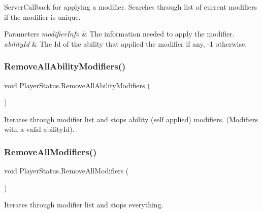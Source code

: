 Server\+Callback for applying a modifier. Searches through list of current modifiers if the modifier is unique. 


\begin{DoxyParams}{Parameters}
{\em modifier\+Info} & The information needed to apply the modifier.\\
\hline
{\em ability\+Id} & The Id of the ability that applied the modifier if any, -\/1 otherwise.\\
\hline
\end{DoxyParams}
\hypertarget{class_player_status_af6f61e3ea4794da66e0df905ec02ccf7}{}\label{class_player_status_af6f61e3ea4794da66e0df905ec02ccf7} 
\subsubsection{\texorpdfstring{Remove\+All\+Ability\+Modifiers()}{RemoveAllAbilityModifiers()}}
{\footnotesize\ttfamily void Player\+Status.\+Remove\+All\+Ability\+Modifiers (\begin{DoxyParamCaption}{ }\end{DoxyParamCaption})}



Iterates through modifier list and stops ability (self applied) modifiers. (Modifiers with a valid ability\+Id). 

\hypertarget{class_player_status_a72dff84382f4ede50e529a80e44c98ac}{}\label{class_player_status_a72dff84382f4ede50e529a80e44c98ac} 
\subsubsection{\texorpdfstring{Remove\+All\+Modifiers()}{RemoveAllModifiers()}}
{\footnotesize\ttfamily void Player\+Status.\+Remove\+All\+Modifiers (\begin{DoxyParamCaption}{ }\end{DoxyParamCaption})}



Iterates through modifier list and stops everything. 

\hypertarget{class_player_status_a8be77a700782937b7e3a65c00e33ef2c}{}\label{class_player_status_a8be77a700782937b7e3a65c00e33ef2c} 
